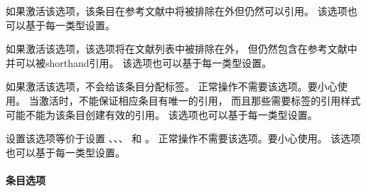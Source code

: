 \begin{optionlist}



如果激活该选项，该条目在参考文献中将被排除在外但仍然可以引用。
该选项也可以基于每一类型设置。



如果激活该选项，该选项将在文献列表中被排除在外，
但仍然包含在参考文献中并可以被shorthand引用。
该选项也可以基于每一类型设置。



如果激活该选项，\biblatex 不会给该条目分配标签。
正常操作不需要该选项。要小心使用。
当激活时，\biblatex 不能保证相应条目有唯一的引用，
而且那些需要标签的引用样式可能不能为该条目创建有效的引用。
该选项也可以基于每一类型设置。



设置该选项等价于设置 、、、 和 。
正常操作不需要该选项。要小心使用。
该选项也可以基于每一类型设置。

\end{optionlist}

\paragraph{条目选项}%
\label{use:opt:bib:entry}

